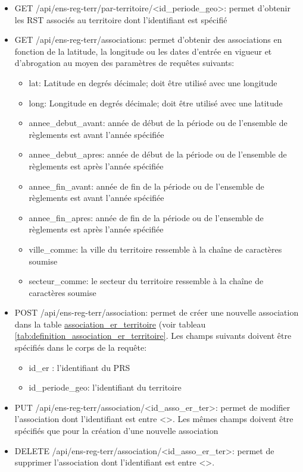 \begin{itemize}
    \item GET /api/ens-reg-terr/par-territoire/<id\_periode\_geo>: permet d'obtenir les \ac{RST} associés au territoire dont l'identifiant est spécifié
    \item GET /api/ens-reg-terr/associations: permet d'obtenir des associations en fonction de la latitude, la longitude ou les dates d'entrée en vigueur et d'abrogation au moyen des paramètres de requêtes suivants:
    \begin{itemize}
        \item lat: Latitude en degrés décimale; doit être utilisé avec une longitude
        \item long: Longitude en degrés décimale; doit être utilisé avec une latitude
        \item annee\_debut\_avant: année de début de la période ou de l'ensemble de règlements est avant l'année spécifiée
        \item annee\_debut\_apres: année de début de la période ou de l'ensemble de règlements est après l'année spécifiée
        \item annee\_fin\_avant: année de fin de la période ou de l'ensemble de règlements est avant l'année spécifiée
        \item annee\_fin\_apres: année de fin de la période ou de l'ensemble de règlements est après l'année spécifiée
        \item ville\_comme: la ville du territoire ressemble à la chaîne de caractères soumise
        \item secteur\_comme: le secteur du territoire ressemble à la chaîne de caractères soumise
    \end{itemize}
    \item POST /api/ens-reg-terr/association: permet de créer une nouvelle association dans la table \underline{association\_er\_territoire} (voir tableau \ref{tab:definition_association_er_territoire}. Les champs suivants doivent être spécifiés dans le corps de la requête:
    \begin{itemize}
        \item id\_er : l'identifiant du \ac{PRS}
        \item id\_periode\_geo: l'identifiant du territoire
    \end{itemize}
    \item PUT /api/ens-reg-terr/association/<id\_asso\_er\_ter>: permet de modifier l'association dont l'identifiant est entre <>. Les mêmes champs doivent être spécifiés que pour la création d'une nouvelle association
    \item DELETE /api/ens-reg-terr/association/<id\_asso\_er\_ter>: permet de supprimer l'association dont l'identifiant est entre <>.
\end{itemize}
